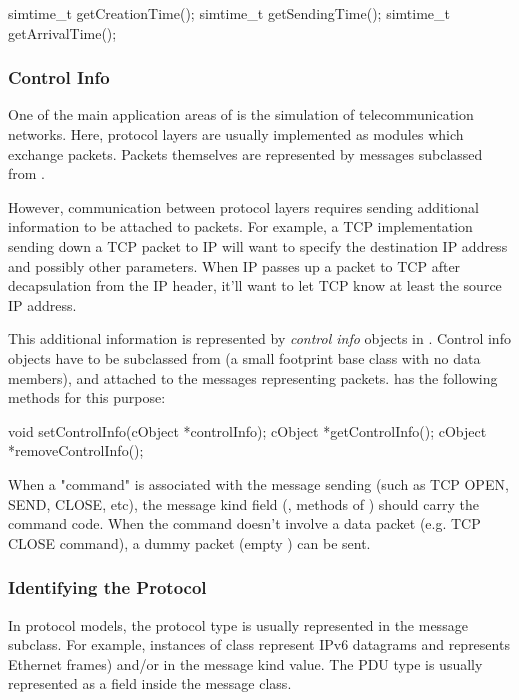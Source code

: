 \begin{cpp}
simtime_t getCreationTime();
simtime_t getSendingTime();
simtime_t getArrivalTime();
\end{cpp}

\subsubsection{Control Info}

One of the main application areas of {\opp} is the simulation of
telecommunication networks. Here, protocol layers are usually
implemented as modules which exchange packets. Packets themselves
are represented by messages subclassed from .

However, communication between protocol layers requires sending
additional information to be attached to packets. For example,
a TCP implementation sending down a TCP packet to IP will want
to specify the destination IP address and possibly
other parameters. When IP passes up a packet to TCP after
decapsulation from the IP header, it'll want to let TCP know
at least the source IP address.

This additional information is represented by \textit{control info}
objects in {\opp}. Control info objects have to be subclassed from
 (a small footprint base class with
no data members), and attached to the messages representing
packets.  has the following methods for this
purpose:

\begin{cpp}
void setControlInfo(cObject *controlInfo);
cObject *getControlInfo();
cObject *removeControlInfo();
\end{cpp}

When a "command" is associated with the message sending (such as
TCP OPEN, SEND, CLOSE, etc), the message kind field (,
 methods of ) should carry the command code.
When the command doesn't involve a data packet (e.g.
TCP CLOSE command), a dummy packet (empty ) can be sent.



\subsubsection{Identifying the Protocol}

In {\opp} protocol models, the protocol type is usually represented
in the message subclass. For example, instances of class
 represent IPv6 datagrams and 
represents Ethernet frames) and/or in the message kind value.
The PDU type is usually represented as a field inside the message class.

